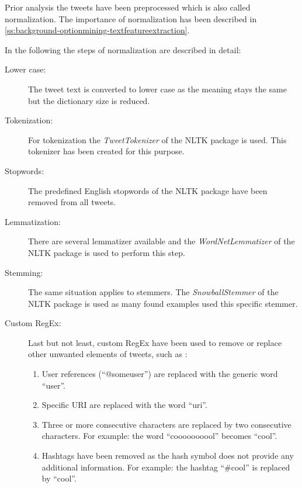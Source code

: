 Prior analysis the tweets have been preprocessed which is also called normalization.
The importance of normalization has been described in \cref{ss:background-optionmining-textfeatureextraction}.

In the following the steps of normalization are described in detail:

\begin{description}

  \item [Lower case:]
    The tweet text is converted to lower case as the meaning stays the same but the dictionary size is reduced.

  \item [Tokenization:]
    For tokenization the \emph{TweetTokenizer} of the \ac{NLTK} package is used.
    This tokenizer has been created for this purpose.

  \item [Stopwords:]
    The predefined English stopwords of the \ac{NLTK} package have been removed from all tweets.
  
  \item [Lemmatization:]
    There are several lemmatizer available and the \emph{WordNetLemmatizer} of the \ac{NLTK} package is used to perform this step.

  \item [Stemming:]
    The same situation applies to stemmers.
    The \emph{SnowballStemmer} of the \ac{NLTK} package is used as many found examples used this specific stemmer.

  \item [Custom \ac{RegEx}:]
    Last but not least, custom \ac{RegEx} have been used to remove or replace other unwanted elements of tweets, such as \citep{Pagolu2016a}:

    \begin{enumerate}
      \item User references (``@someuser'') are replaced with the generic word ``user''.
      \item Specific URI are replaced with the word ``uri''.
      \item Three or more consecutive characters are replaced by two consecutive characters.
        For example: the word ``coooooooool'' becomes ``cool''.
      \item Hashtags have been removed as the hash symbol does not provide any additional information. 
        For example: the hashtag ``\#cool'' is replaced by ``cool''.
    \end{enumerate}

\end{description}

